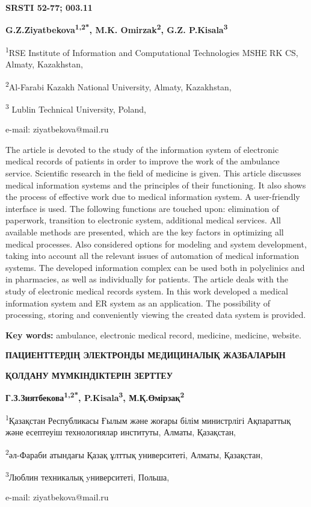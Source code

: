 \clearpage
{\bfseries SRSTI 52-77; 003.11}

\begin{center}
{\bfseries G.Z.Ziyatbekova\textsuperscript{1,2*}, M.K.
Omirzak\textsuperscript{2}, G.Z. P.Kisala\textsuperscript{3}}

\textsuperscript{1}RSE Institute of Information and Computational
Technologies MSHE RK CS, Almaty, Kazakhstan,

\textsuperscript{2}Al-Farabi Kazakh National University, Almaty,
Kazakhstan,

\textsuperscript{3} Lublin Technical University,
Poland,

e-mail: ziyatbekova@mail.ru
\end{center}

The article is devoted to the study of the
information system of electronic medical records of patients in order to
improve the work of the ambulance service. Scientific research in the
field of medicine is given. This article discusses medical information
systems and the principles of their functioning. It also shows the
process of effective work due to medical information system. A
user-friendly interface is used. The following functions are touched
upon: elimination of paperwork, transition to electronic system,
additional medical services. All available methods are presented, which
are the key factors in optimizing all medical processes. Also considered
options for modeling and system development, taking into account all the
relevant issues of automation of medical information systems. The
developed information complex can be used both in polyclinics and in
pharmacies, as well as individually for patients. The article deals with
the study of electronic medical records system. In this work developed a
medical information system and ER system as an application. The
possibility of processing, storing and conveniently viewing the created
data system is provided.

{\bfseries Key words:} ambulance, electronic medical record, medicine,
medicine, website.

\begin{center}
{\large\bfseries ПАЦИЕНТТЕРДІҢ ЭЛЕКТРОНДЫ МЕДИЦИНАЛЫҚ ЖАЗБАЛАРЫН}

\vspace{1em}
{\bfseries ҚОЛДАНУ МҮМКІНДІКТЕРІН ЗЕРТТЕУ}

{\bfseries Г.З.Зиятбекова\textsuperscript{1,2*},
P.Kisala\textsuperscript{3}, М.Қ.Өмірзақ\textsuperscript{2}}

\textsuperscript{1}Қазақстан Республикасы Ғылым және жоғары білім
министрлігі Ақпараттық және есептеуіш технологиялар институты, Алматы,
Қазақстан,

\textsuperscript{2}әл-Фараби атындағы Қазақ ұлттық университеті, Алматы, Қазақстан,

\textsuperscript{3}Люблин техникалық yниверситеті, Польша,

e-mail: ziyatbekova@mail.ru
\end{center}

